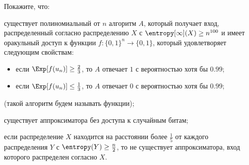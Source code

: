 Покажите, что:
\begin{enumcyr}
    \item существует полиномиальный от $n$ алгоритм $A$, который получает вход, распределенный согласно
        распределению $X$ с $\entropy[\infty](X) \ge n^{100}$ и имеет оракульный доступ к функции
        $f\colon \{0, 1\}^n \to  \{0, 1\}$, который  удовлетворяет следующим свойствам:
        \begin{itemize}
            \item если $\Exp[f(u_n)] \ge \frac{2}{3}$, то $A$ отвечает $1$ с вероятностью хотя бы $0.99$;
            \item если $\Exp[f(u_n)] \le \frac{1}{3}$, то $A$ отвечает $0$ с вероятностью хотя бы $0.99$;
        \end{itemize}
        (такой алгоритм будем называть  функции);
    \item существует аппроксиматора без доступа к случайным битам;
    \item если распределение $X$ находится на расстоянии более $\frac{1}{5}$ от каждого распределения $Y$
        с $\entropy(Y) \ge \frac{n}{2}$, то не существует аппроксиматора, вход которого распределен
        согласно $X$.
\end{enumcyr}